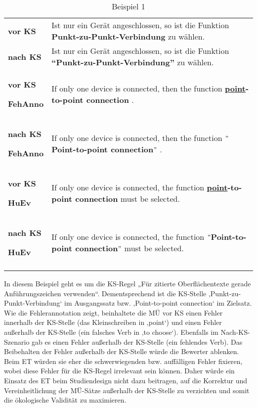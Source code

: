 \begin{table}
    \begin{tabularx}{\textwidth}{p{}Q}
\lsptoprule
\textbf{vor KS} & Ist nur ein Gerät angeschlossen, so ist die Funktion \textbf{Punkt-zu-Punkt-Verbindung} zu wählen.\\
\tablevspace
\textbf{nach KS} & Ist nur ein Gerät angeschlossen, so ist die Funktion \textbf{``Punkt-zu-Punkt-Verbindung''} zu wählen.\\
\midrule
\textbf{vor KS}

\textbf{FehAnno} & If only one device is connected, then the function \textbf{\ul{point}-to-point connection} .\\
\tablevspace
\textbf{nach KS}

\textbf{FehAnno} & If only one device is connected, then the function \textbf{$"$Point-to-point connection$"$} .\\
\midrule
\textbf{vor KS}

\textbf{HuEv} & If only one device is connected, the function \textbf{\ul{point}-to-point connection} must be selected.\\
\tablevspace
\textbf{nach KS}

\textbf{HuEv} & If only one device is connected, the function \textbf{$"$Point-to-point connection$"$} must be selected.\\
\lspbottomrule
    \end{tabularx}
    \caption{Beispiel 1}
    \label{tabex:3:1}

\end{table}

In diesem Beispiel geht es um die KS-Regel „Für zitierte Oberflächentexte gerade Anführungszeichen verwenden“. Dementsprechend ist die KS-Stelle ‚Punkt-zu-Punkt-Verbindung‘ im Ausgangssatz bzw. ‚Point-to-point connection‘ im Zielsatz. Wie die Fehlerannotation zeigt, beinhaltete die MÜ vor KS einen Fehler innerhalb der KS-Stelle (das Kleinschreiben in ‚point‘) und einen Fehler außerhalb der KS-Stelle (ein falsches Verb in ‚to choose‘). Ebenfalls im Nach-KS-Szenario gab es einen Fehler außerhalb der KS-Stelle (ein fehlendes Verb). Das Beibehalten der Fehler außerhalb der KS-Stelle würde die Bewerter ablenken. Beim ET würden sie eher die schwerwiegenden bzw. auffälligen Fehler fixieren, wobei diese Fehler für die KS-Regel irrelevant sein können. Daher würde ein Einsatz des ET beim Studiendesign nicht dazu beitragen, auf die Korrektur und Vereinheitlichung der MÜ-Sätze außerhalb der KS-Stelle zu verzichten und somit die ökologische Validität zu maximieren.

